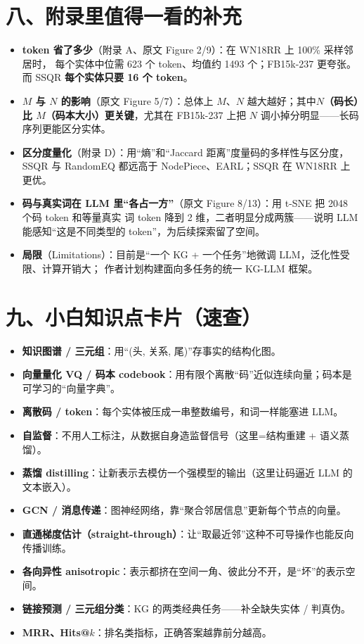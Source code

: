 \documentclass[11pt,UTF8,fontset=fandol]{ctexart}
\begin{document}
\section{八、附录里值得一看的补充}
\begin{itemize}[leftmargin=2em]
  \item \textbf{token 省了多少}（附录 A、原文 Figure 2/9）：在 WN18RR 上 100\% 采样邻居时，
        每个实体中位需 623 个 token、均值约 1493 个；FB15k-237 更夸张。而 SSQR \textbf{每个实体只要 16 个 token}。
  \item \textbf{$M$ 与 $N$ 的影响}（原文 Figure 5/7）：总体上 $M$、$N$ 越大越好；其中\textbf{$N$（码长）比
        $M$（码本大小）更关键}，尤其在 FB15k-237 上把 $N$ 调小掉分明显——长码序列更能区分实体。
  \item \textbf{区分度量化}（附录 D）：用“熵”和“Jaccard 距离”度量码的多样性与区分度，SSQR 与 RandomEQ
        都远高于 NodePiece、EARL；SSQR 在 WN18RR 上更优。
  \item \textbf{码与真实词在 LLM 里“各占一方”}（原文 Figure 8/13）：用 t-SNE 把 2048 个码 token 和等量真实
        词 token 降到 2 维，二者明显分成两簇——说明 LLM 能感知“这是不同类型的 token”，为后续探索留了空间。
  \item \textbf{局限}（Limitations）：目前是“一个 KG + 一个任务”地微调 LLM，泛化性受限、计算开销大；
        作者计划构建面向多任务的统一 KG-LLM 框架。
\end{itemize}

\section{九、小白知识点卡片（速查）}
\begin{itemize}[leftmargin=2em]
  \item \textbf{知识图谱 / 三元组}：用“(头, 关系, 尾)”存事实的结构化图。
  \item \textbf{向量量化 VQ / 码本 codebook}：用有限个离散“码”近似连续向量；码本是可学习的“向量字典”。
  \item \textbf{离散码 / token}：每个实体被压成一串整数编号，和词一样能塞进 LLM。
  \item \textbf{自监督}：不用人工标注，从数据自身造监督信号（这里=结构重建 + 语义蒸馏）。
  \item \textbf{蒸馏 distilling}：让新表示去模仿一个强模型的输出（这里让码逼近 LLM 的文本嵌入）。
  \item \textbf{GCN / 消息传递}：图神经网络，靠“聚合邻居信息”更新每个节点的向量。
  \item \textbf{直通梯度估计（straight-through）}：让“取最近邻”这种不可导操作也能反向传播训练。
  \item \textbf{各向异性 anisotropic}：表示都挤在空间一角、彼此分不开，是“坏”的表示空间。
  \item \textbf{链接预测 / 三元组分类}：KG 的两类经典任务——补全缺失实体 / 判真伪。
  \item \textbf{MRR、Hits@$k$}：排名类指标，正确答案越靠前分越高。
\end{itemize}
\end{document}

